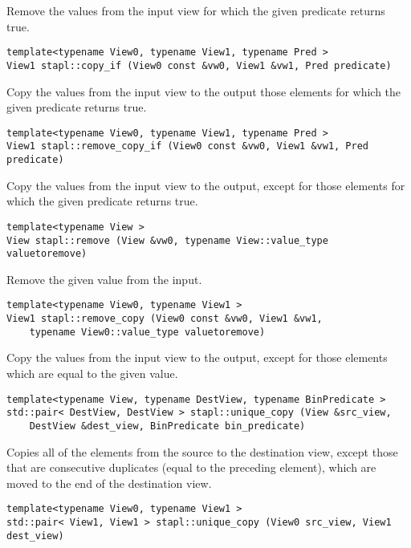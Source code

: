 Remove the values from the input view for which the given predicate returns true.

\begin{verbatim}
template<typename View0, typename View1, typename Pred >
View1 stapl::copy_if (View0 const &vw0, View1 &vw1, Pred predicate)
\end{verbatim}

Copy the values from the input view to the output those elements for which the given predicate returns true.

\begin{verbatim}
template<typename View0, typename View1, typename Pred >
View1 stapl::remove_copy_if (View0 const &vw0, View1 &vw1, Pred predicate)
\end{verbatim}

Copy the values from the input view to the output, except for those elements for which the given predicate returns true.

\begin{verbatim}
template<typename View >
View stapl::remove (View &vw0, typename View::value_type valuetoremove)
\end{verbatim}

Remove the given value from the input.

\begin{verbatim}
template<typename View0, typename View1 >
View1 stapl::remove_copy (View0 const &vw0, View1 &vw1,
    typename View0::value_type valuetoremove)
\end{verbatim}

Copy the values from the input view to the output, except for those elements which are equal to the given value.

\begin{verbatim}
template<typename View, typename DestView, typename BinPredicate >
std::pair< DestView, DestView > stapl::unique_copy (View &src_view,
    DestView &dest_view, BinPredicate bin_predicate)
\end{verbatim}

Copies all of the elements from the source to the destination view, except those that are consecutive duplicates (equal to the preceding element), which are moved to the end of the destination view.

\begin{verbatim}
template<typename View0, typename View1 >
std::pair< View1, View1 > stapl::unique_copy (View0 src_view, View1 dest_view)
\end{verbatim}

